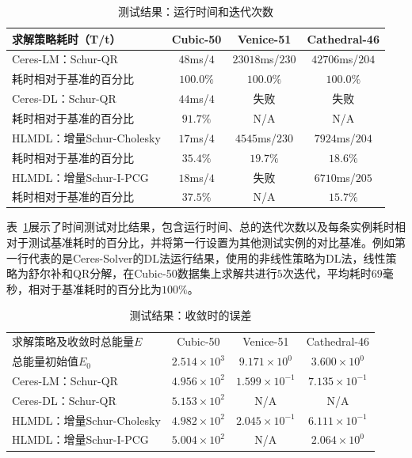 {
\linespread{1}
\begin{table}[htb!]
\caption{测试结果：运行时间和迭代次数}
\label{tab:time}
\centering
\begin{tabular}[b]{l|ccc}
    \toprule
    求解策略耗时（T/t）       &   Cubic-50 &       Venice-51 &    Cathedral-46 \\ \midrule
    Ceres-LM：Schur-QR        & $48$ms/$4$ & $23018$ms/$230$ & $42706$ms/$204$ \\
    耗时相对于基准的百分比    &  $100.0\%$ &       $100.0\%$ &       $100.0\%$ \\ \midrule
    Ceres-DL：Schur-QR        & $44$ms/$4$ &            失败 &            失败 \\
    耗时相对于基准的百分比    &   $91.7\%$ &             N/A &             N/A \\ \midrule
    HLMDL：增量Schur-Cholesky & $17$ms/$4$ &  $4545$ms/$230$ &  $7924$ms/$204$ \\
    耗时相对于基准的百分比    &   $35.4\%$ &        $19.7\%$ &        $18.6\%$ \\ \midrule
    HLMDL：增量Schur-I-PCG    & $18$ms/$4$ &            失败 &  $6710$ms/$205$ \\
    耗时相对于基准的百分比    &   $37.5\%$ &             N/A &        $15.7\%$ \\
    \bottomrule
\end{tabular}
\end{table}
}

表~\ref{tab:time}展示了时间测试对比结果，包含运行时间、总的迭代次数以及每条实例耗时相对于测试基准耗时的百分比，并将第一行设置为其他测试实例的对比基准。例如第一行代表的是Ceres-Solver的DL法运行结果，使用的非线性策略为DL法，线性策略为舒尔补和QR分解，在Cubic-50数据集上求解共进行$5$次迭代，平均耗时$69$毫秒，相对于基准耗时的百分比为$100\%$。

{
\linespread{1}
\begin{table}[htb!]
\caption{测试结果：收敛时的误差}
\label{tab:energy}
\centering
\begin{tabular}[b]{l|ccc}
    \toprule
    求解策略及收敛时总能量$E$ &          Cubic-50 &            Venice-51 &         Cathedral-46 \\
    总能量初始值$E_0$         & $2.514\times10^3$ &  $9.171\times10^{0}$ &  $3.600\times10^{0}$ \\ \midrule
    Ceres-LM：Schur-QR        & $4.956\times10^2$ & $1.599\times10^{-1}$ & $7.135\times10^{-1}$ \\
    Ceres-DL：Schur-QR        & $5.153\times10^2$ &                  N/A &                  N/A \\
    HLMDL：增量Schur-Cholesky & $4.982\times10^2$ & $2.045\times10^{-1}$ & $6.111\times10^{-1}$ \\
    HLMDL：增量Schur-I-PCG    & $5.004\times10^2$ &                  N/A &  $2.064\times10^{0}$ \\
    \bottomrule
\end{tabular}
\end{table}
}

